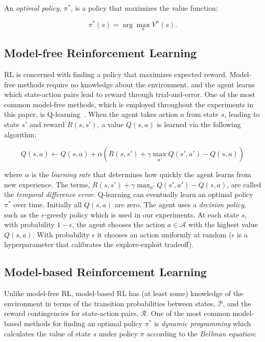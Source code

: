 \documentclass[letterpaper]{article}
\begin{document}
\noindent
An \textit{optimal policy}, $\pi^{*}$, is a policy that maximizes the value function:

\begin{equation}
\pi^{*}(s) = \arg\max_a V^{\pi}(s).
\end{equation}

\subsection{Model-free Reinforcement Learning}

RL is concerned with finding a policy that maximizes expected reward. Model-free methods require no knowledge about the environment, and the agent learns which state-action pairs lead to reward through trial-and-error. One of the most common model-free methods, which is employed throughout the experiments in this paper, is Q-learning~\cite{sutton1998reinforcement}. When the agent takes action $a$ from state $s$, leading to state $s'$ and reward $R(s,s')$, a value $Q(s,a)$ is learned via the following algorithm:

\begin{equation}
Q(s,a) \leftarrow Q(s,a) + \alpha (R(s, s') + \gamma \max_{a'} Q(s', a') - Q(s,a))
\end{equation}

\noindent
where $\alpha$ is the \textit{learning rate} that determines how quickly the agent learns from new experience. The terms, $R(s, s') + \gamma \max_{a'} Q(s', a') - Q(s,a)$, are called the \textit{temporal difference error}. Q-learning can eventually learn an optimal policy $\pi^*$ over time. Initially all $Q(s,a)$ are zero. The agent uses a \textit{decision policy}, such as the $\epsilon$-greedy policy which is used in our experiments. At each state $s$, with probability $1 - \epsilon$, the agent chooses the action $a \in \mathcal{A}$ with the highest value $Q(s,a)$. With probability $\epsilon$ it chooses an action uniformly at random ($\epsilon$ is a hyperparameter that calibrates the explore-exploit tradeoff).
 
\subsection{Model-based Reinforcement Learning}

Unlike model-free RL, model-based RL has (at least some) knowledge of the environment in terms of the transition probabilities between states, $\mathcal{P}$, and the reward contingencies for state-action pairs, $\mathcal{R}$. One of the most common model-based methods for finding an optimal policy $\pi^*$ is \textit{dynamic programming} which calculates the value of state $s$ under policy $\pi$ according to the \textit{Bellman equation}:
\end{document}
